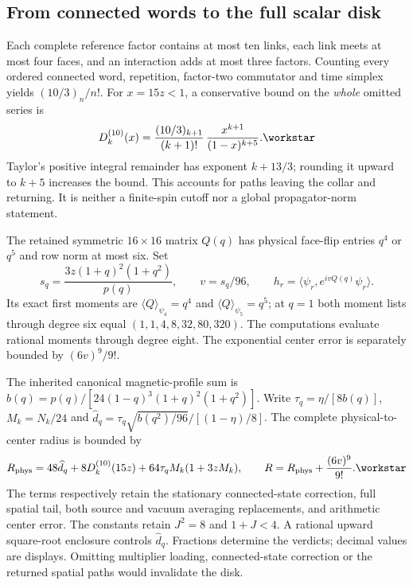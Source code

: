\subsection{From connected words to the full scalar disk}
Each complete reference factor contains at most ten links, each link meets at most four faces, and an interaction adds at most three factors. Counting every ordered connected word, repetition, factor-two commutator and time simplex yields $(10/3)_n/n!$. For $x=15z<1$, a conservative bound on the \emph{whole} omitted series is
\begin{equation}
D_k^{(10)}(x)=\frac{(10/3)_{k+1}}{(k+1)!}\,
\frac{x^{k+1}}{(1-x)^{k+5}}.\workstar
\label{r27:eq:tail}
\end{equation}
Taylor's positive integral remainder has exponent $k+13/3$; rounding it upward to $k+5$ increases the bound. This accounts for paths leaving the collar and returning. It is neither a finite-spin cutoff nor a global propagator-norm statement.

The retained symmetric $16\times16$ matrix $Q(q)$ has physical face-flip entries $q^4$ or $q^5$ and row norm at most six. Set
\begin{equation}
s_q=\frac{3z(1+q)^2(1+q^2)}{p(q)},\qquad v=s_q/96,\qquad
h_r=\langle\psi_r,e^{ivQ(q)}\psi_r\rangle.
\label{r27:eq:center}
\end{equation}
Its exact first moments are $\langle Q\rangle_{\psi_4}=q^4$ and
$\langle Q\rangle_{\psi_5}=q^5$; at $q=1$ both moment lists through degree six equal $(1,1,4,8,32,80,320)$. The computations evaluate rational moments through degree eight. The exponential center error is separately bounded by $(6v)^9/9!$.

The inherited canonical magnetic-profile sum is
$b(q)=p(q)/[24(1-q)^3(1+q)^2(1+q^2)]$. Write
$\tau_q=\eta/[8b(q)]$, $M_k=N_k/24$ and
$\widehat d_q=\tau_q\sqrt{b(q^2)/96}/[(1-\eta)/8]$.
The complete physical-to-center radius is bounded by
\begin{equation}
R_{\mathrm{phys}}=48\widehat d_q+8D_k^{(10)}(15z)
+64\tau_qM_k(1+3zM_k),\qquad
R=R_{\mathrm{phys}}+\frac{(6v)^9}{9!}.\workstar
\label{r27:eq:disk}
\end{equation}
The terms respectively retain the stationary connected-state correction, full spatial tail, both source and vacuum averaging replacements, and arithmetic center error. The constants retain $J^2=8$ and $1+J<4$. A rational upward square-root enclosure controls $\widehat d_q$. Fractions determine the verdicts; decimal values are displays. Omitting multiplier loading, connected-state correction or the returned spatial paths would invalidate the disk.


